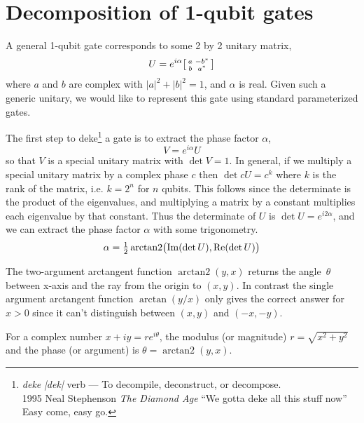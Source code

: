 


\clearpage
\section{Decomposition of 1-qubit gates}
A general 1-qubit gate corresponds to some 2 by 2 unitary matrix,
\[
U = 
e^{i\alpha}\begin{bsmallmatrix}
a & -b^* \\
b & a^*
\end{bsmallmatrix}\]
where $a$ and $b$ are complex with $|a|^2 + |b|^2 = 1$, and  $\alpha$ is real.
Given such a generic unitary, we would like to represent this gate using standard parameterized gates.   

The first step to deke\footnote{
{\sl deke} {\sl |dek|} verb --- To decompile, deconstruct, or decompose.
\\ 1995  Neal Stephenson {\sl The Diamond Age} ``We gotta deke all this stuff now'' Easy come, easy go.
} a gate is to extract the phase factor $\alpha$,
\[
V = e^{i\alpha} U
\]
so that $V$ is a special unitary matrix with $\det V=1$. In general, if we multiply a special unitary matrix by a complex phase $c$ then $\det cU=c^k$ where $k$ is the rank of the matrix, i.e. $k=2^n$ for $n$ qubits. This follows since the determinate is the product of the eigenvalues, and multiplying a matrix by a constant multiplies each eigenvalue by that constant.
Thus the determinate of $U$ is $\det U=e^{i 2 \alpha }$, and we can extract the phase factor $\alpha$ with some trigonometry.
\[
\alpha = \tfrac{1}{2} \operatorname{arctan2}\bigl(\operatorname{Im}(\det U), \operatorname{Re}(\det U)\bigr)
\label{phase_extraction}
\]

The two-argument arctangent function $\operatorname{arctan2}(y,x)$ returns the angle~$\theta$ between x-axis and the ray from the origin to $(x, y)$. In contrast the single argument arctangent function $\arctan(y/x)$ only gives the correct answer for $x>0$ since it can't distinguish between $(x,y)$ and $(-x, -y)$.
\begin{center}
\end{center}
For a complex number $x+iy = r e^{i\theta}$, the modulus (or magnitude) $r=\sqrt{x^2+y^2}$ and the phase (or argument) is $\theta = \operatorname{arctan2}(y,x)$. 

